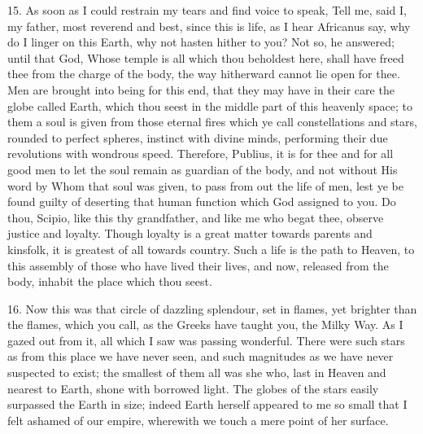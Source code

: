 \documentclass[a4paper, 11pt, oneside, polutonikogreek, english]{article}
\begin{document}
15. As soon as I could restrain my tears and find voice to speak, Tell me, said I, my father, most reverend and best, since this is life, as I hear Africanus say, why do I linger on this Earth, why not hasten hither to you? Not so, he answered; until that God, Whose temple is all which thou beholdest here, shall have freed thee from the charge of the body, the way hitherward cannot lie open for thee. Men are brought into being for this end, that they may have in their care the globe called Earth, which thou seest in the middle part of this heavenly space; to them a soul is given from those eternal fires which ye call constellations and stars, rounded to perfect spheres, instinct with divine minds, performing their due revolutions with wondrous speed. Therefore, Publius, it is for thee and for all good men to let the soul remain as guardian of the body, and not without His word by Whom that soul was given, to pass from out the life of men, lest ye be found guilty of deserting that human function which God assigned to you. Do thou, Scipio, like this thy grandfather, and like me who begat thee, observe justice and loyalty. Though loyalty is a great matter towards parents and kinsfolk, it is greatest of all towards country. Such a life is the path to Heaven, to this assembly of those who have lived their lives, and now, released from the body, inhabit the place which thou seest.

16. Now this was that circle of dazzling splendour, set in flames, yet brighter than the flames, which you call, as the Greeks have taught you, the Milky Way. As I gazed out from it, all which I saw was passing wonderful. There were such stars as from this place we have never seen, and such magnitudes as we have never suspected to exist; the smallest of them all was she who, last in Heaven and nearest to Earth, shone with borrowed light. The globes of the stars easily surpassed the Earth in size; indeed Earth herself appeared to me so small that I felt ashamed of our empire, wherewith we touch a mere point of her surface.
\end{document}
